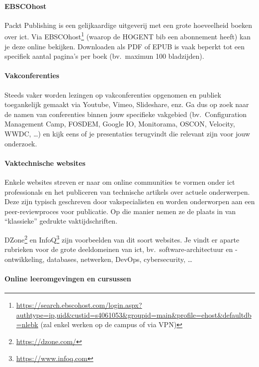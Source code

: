 \paragraph{EBSCOhost}

Packt Publishing is een gelijkaardige uitgeverij met een grote hoeveelheid boeken over ict. Via EBSCOhost\footnote{\url{https://search.ebscohost.com/login.aspx?authtype=ip,uid&custid=s4061053&groupid=main&profile=ehost&defaultdb=nlebk} (zal enkel werken op de campus of via VPN)} (waarop de HOGENT bib een abonnement heeft) kan je deze online bekijken. Downloaden als PDF of EPUB is vaak beperkt tot een specifiek aantal pagina's per boek (bv.\ maximun 100 bladzijden).

\paragraph{Vakconferenties}

Steeds vaker worden lezingen op vakconferenties opgenomen en publiek toegankelijk gemaakt via Youtube, Vimeo, Slideshare, enz. Ga dus op zoek naar de namen van conferenties binnen jouw specifieke vakgebied (bv.\ Configuration Management Camp, FOSDEM, Google IO, Monitorama, OSCON, Velocity, WWDC, \ldots) en kijk eens of je presentaties terugvindt die relevant zijn voor jouw onderzoek.

\paragraph{Vaktechnische websites}

Enkele websites streven er naar om online communities te vormen onder ict professionals en het publiceren van technische artikels over actuele onderwerpen. Deze zijn typisch geschreven door vakspecialisten en worden onderworpen aan een peer-re\-view\-pro\-ces voor publicatie. Op die manier nemen ze de plaats in van ``klassieke'' gedrukte vaktijdschriften.

DZone\footnote{\url{https://dzone.com/}} en InfoQ\footnote{\url{https://www.infoq.com}} zijn voorbeelden van dit soort websites. Je vindt er aparte rubrieken voor de grote deeldomeinen van ict, bv.\ software-architectuur en -ont\-wik\-ke\-ling, databases, netwerken, DevOps, cybersecurity, \ldots

\paragraph{Online leeromgevingen en cursussen}

